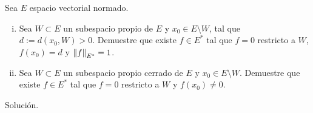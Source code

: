 \begin{homeworkProblem}
  Sea $E$ espacio vectorial normado.
  \begin{enumerate}[(i)]
    \item Sea $W\subset E$ un subespacio propio de $E$ y $x_0\in E\setminus W$, tal que $d:=d(x_0,W)>0$. Demuestre que existe $f\in E^{*}$ tal que $f=0$ restricto a $W$, $f(x_0)=d$ y $\left\|f\right\|_{E^*}=1$.
    \item Sea $W\subset E$ un subespacio propio cerrado de $E$ y $x_0\in E\setminus W$. Demuestre que existe $f\in E^{*}$ tal que $f=0$ restricto a $W$ y $f(x_0)\neq 0$. 
  \end{enumerate}
  \begin{solution}
    Solución.
  \end{solution}
\end{homeworkProblem}

